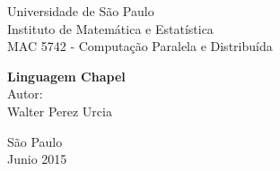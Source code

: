 \vspace*{-2cm}
{\bf
\begin{center}
{\large
\hspace*{0cm}Universidade de São Paulo} \\
\hspace*{0cm}Instituto de Matemática e Estatística \\
\hspace*{0cm}MAC 5742 - Computação Paralela e Distribuída  \\
\end{center}}
\vspace{4.0cm}
\noindent
\begin{center}
{\Large \bf Linguagem Chapel} \\[3cm]
{\Large Autor:}\\[6mm]
{\Large Walter Perez Urcia}\\[6mm]
\end{center}

\vspace{8cm}
{\center São Paulo \\[3mm]
Junio 2015 \\}

\newpage
\clearpage